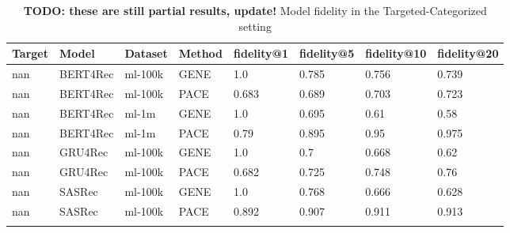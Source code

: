 \begingroup
    \setlength{\tabcolsep}{6pt} %
    \renewcommand{\arraystretch}{1.2} %
    \small %
    \begin{longtable}{|l|l|l|l|l|l|l|l|}
    \hline
\textbf{Target} & \textbf{Model} & \textbf{Dataset} & \textbf{Method} & \textbf{fidelity@1} & \textbf{fidelity@5} & \textbf{fidelity@10} & \textbf{fidelity@20} \\ \hline
\endhead
nan & BERT4Rec & ml-100k & GENE & 1.0 & 0.785 & 0.756 & 0.739 \\
nan & BERT4Rec & ml-100k & PACE & 0.683 & 0.689 & 0.703 & 0.723 \\\hline
nan & BERT4Rec & ml-1m & GENE & 1.0 & 0.695 & 0.61 & 0.58 \\
nan & BERT4Rec & ml-1m & PACE & 0.79 & 0.895 & 0.95 & 0.975 \\\hline
nan & GRU4Rec & ml-100k & GENE & 1.0 & 0.7 & 0.668 & 0.62 \\
nan & GRU4Rec & ml-100k & PACE & 0.682 & 0.725 & 0.748 & 0.76 \\\hline
nan & SASRec & ml-100k & GENE & 1.0 & 0.768 & 0.666 & 0.628 \\
nan & SASRec & ml-100k & PACE & 0.892 & 0.907 & 0.911 & 0.913 \\\hline
\caption{\textbf{TODO: these are still partial results, update!} Model fidelity in the Targeted-Categorized setting}
    \label{tab:eval_targ_cat}
    \end{longtable}
    \endgroup
